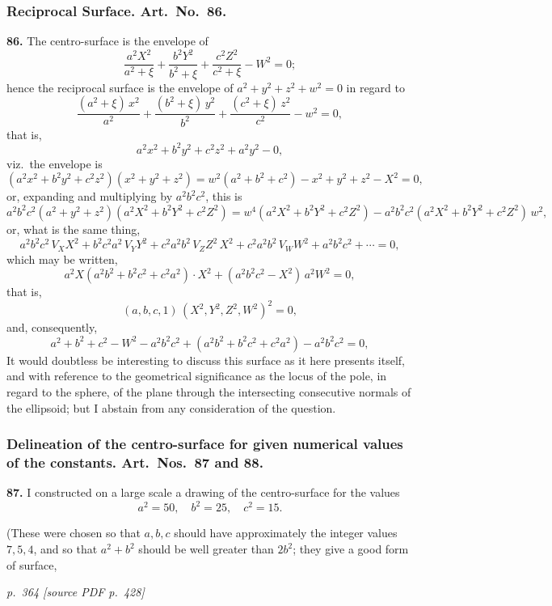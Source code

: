 \documentclass[11pt,a4paper]{article}
\newcommand{\pagemarker}[2]{\par\bigskip\noindent\textit{p.~#1 [source PDF p.~#2]}\par\smallskip}
\begin{document}
\subsubsection*{Reciprocal Surface. Art.\ No.\ 86.}

\textbf{86.} The centro-surface is the envelope of
\[
\frac{a^2 X^2}{a^2 + \xi} + \frac{b^2 Y^2}{b^2 + \xi} + \frac{c^2 Z^2}{c^2 + \xi} - W^2 = 0;
\]
hence the reciprocal surface is the envelope of $a^2 + y^2 + z^2 + w^2 = 0$ in regard to
\[
\frac{(a^2 + \xi)\,x^2}{a^2}+\frac{(b^2 + \xi)\,y^2}{b^2}+\frac{(c^2 + \xi)\,z^2}{c^2} - w^2 = 0,
\]
that is,
\[
a^2 x^2 + b^2 y^2 + c^2 z^2 + a^2 y^2 - 0,
\]
viz.\ the envelope is
\[
(a^2 x^2 + b^2 y^2 + c^2 z^2)(x^2 + y^2 + z^2) = w^2 (a^2 + b^2 + c^2) - x^2 + y^2 + z^2 - X^2 = 0,
\]
or, expanding and multiplying by $a^2 b^2 c^2$, this is
\[
a^2 b^2 c^2 (a^2 + y^2 + z^2)(a^2 X^2 + b^2 Y^2 + c^2 Z^2) = w^4 (a^2 X^2 + b^2 Y^2 + c^2 Z^2) - a^2 b^2 c^2 (a^2 X^2 + b^2 Y^2 + c^2 Z^2)\,w^2,
\]
or, what is the same thing,
\[
a^2 b^2 c^2 \,V_X X^2 + b^2 c^2 a^2 \,V_Y Y^2 + c^2 a^2 b^2 \,V_Z Z^2 \,X^2 + c^2 a^2 b^2 \,V_W W^2 + a^2 b^2 c^2 + \cdots = 0,
\]
which may be written,
\[
a^2 X(a^2 b^2 + b^2 c^2 + c^2 a^2) \cdot X^2 + (a^2 b^2 c^2 - X^2)\,a^2 W^2 = 0,
\]
that is,
\[
(a, b, c, 1)\,(X^2, Y^2, Z^2, W^2)^2 = 0,
\]
and, consequently,
\[
a^2 + b^2 + c^2 - W^2 - a^2 b^2 c^2 + (a^2 b^2 + b^2 c^2 + c^2 a^2) - a^2 b^2 c^2 = 0,
\]
It would doubtless be interesting to discuss this surface as it here presents itself,
and with reference to the geometrical significance as the locus of the pole, in regard to the sphere, of the plane through the intersecting consecutive normals of the ellipsoid; but I abstain from any consideration of the question.

\subsubsection*{Delineation of the centro-surface for given numerical values of the constants. Art.\ Nos.\ 87 and 88.}

\textbf{87.} I constructed on a large scale a drawing of the centro-surface for the values
\[
a^2 = 50,\quad b^2 = 25,\quad c^2 = 15.
\]

(These were chosen so that $a, b, c$ should have approximately the integer values
$7, 5, 4$, and so that $a^2+b^2$ should be well greater than $2b^2$; they give a
good form of surface,

\clearpage

\bigskip
\pagemarker{364}{428}
\smallskip
\end{document}

